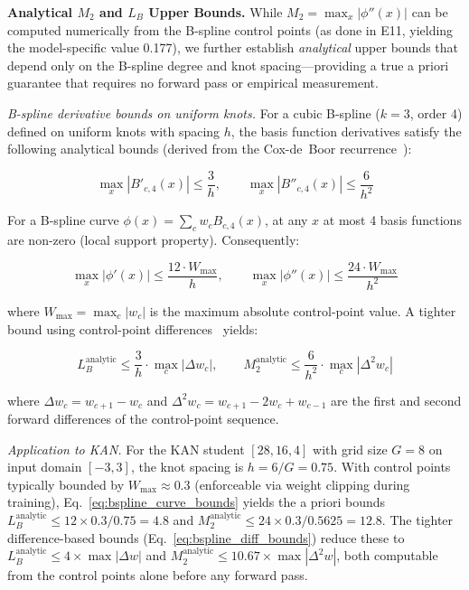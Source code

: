 \vspace{4pt}
\noindent\textbf{Analytical $M_2$ and $L_B$ Upper Bounds.}
While $M_2 = \max_x |\phi''(x)|$ can be computed numerically from the B-spline
control points (as done in E11, yielding the model-specific value 0.177), we
further establish \textit{analytical} upper bounds that depend only on the
B-spline degree and knot spacing---providing a true a priori guarantee that
requires no forward pass or empirical measurement.

\textit{B-spline derivative bounds on uniform knots.}
For a cubic B-spline ($k=3$, order 4) defined on uniform knots with spacing $h$,
the basis function derivatives satisfy the following analytical bounds
(derived from the Cox-de~Boor recurrence~\cite{deBoor1978}):

\begin{equation}
\max_x |B'_{c,4}(x)| \leq \frac{3}{h},
\qquad
\max_x |B''_{c,4}(x)| \leq \frac{6}{h^2}
\label{eq:bspline_basis_bounds}
\end{equation}

For a B-spline curve $\phi(x) = \sum_c w_c B_{c,4}(x)$, at any $x$ at most 4
basis functions are non-zero (local support property). Consequently:

\begin{equation}
\max_x |\phi'(x)| \leq \frac{12 \cdot W_{\max}}{h},
\qquad
\max_x |\phi''(x)| \leq \frac{24 \cdot W_{\max}}{h^2}
\label{eq:bspline_curve_bounds}
\end{equation}

where $W_{\max} = \max_c |w_c|$ is the maximum absolute control-point value.
A tighter bound using control-point differences~\cite{deBoor1978} yields:

\begin{equation}
L_B^{\text{analytic}} \leq \frac{3}{h} \cdot \max_c |\Delta w_c|,
\qquad
M_2^{\text{analytic}} \leq \frac{6}{h^2} \cdot \max_c |\Delta^2 w_c|
\label{eq:bspline_diff_bounds}
\end{equation}

where $\Delta w_c = w_{c+1} - w_c$ and $\Delta^2 w_c = w_{c+1} - 2w_c + w_{c-1}$
are the first and second forward differences of the control-point sequence.

\textit{Application to KAN.}
For the KAN student $[28,16,4]$ with grid size $G=8$ on input domain $[-3,3]$,
the knot spacing is $h = 6/G = 0.75$. With control points typically bounded by
$W_{\max} \approx 0.3$ (enforceable via weight clipping during training),
Eq.~\ref{eq:bspline_curve_bounds} yields the a priori bounds
$L_B^{\text{analytic}} \leq 12 \times 0.3 / 0.75 = 4.8$ and
$M_2^{\text{analytic}} \leq 24 \times 0.3 / 0.5625 = 12.8$. The tighter
difference-based bounds (Eq.~\ref{eq:bspline_diff_bounds}) reduce these
to $L_B^{\text{analytic}} \leq 4 \times \max|\Delta w|$ and
$M_2^{\text{analytic}} \leq 10.67 \times \max|\Delta^2 w|$, both computable
from the control points alone before any forward pass.

